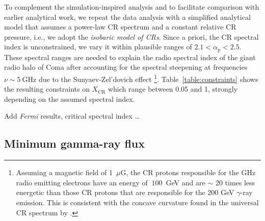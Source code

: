\documentclass[12pt,manuscript]{aastex}
\newcommand{\rmn}{\mathrm}
\newcommand{\CR}{\mathrm{CR}}
\begin{document}
To complement the simulation-inspired analysis and to facilitate comparison with
earlier analytical work, we repeat the data analysis with a simplified
analytical model that assumes a power-law CR spectrum and a constant relative CR
pressure, i.e., we adopt the {\em isobaric model of CRs}. Since a priori, the CR
spectral index is unconstrained, we vary it within plausible ranges of
$2.1<\alpha_\rmn{p}<2.5$. These spectral ranges are needed to explain the radio
spectral index of the giant radio halo of Coma after accounting for the spectral
steepening at frequencies $\nu\sim5~\rmn{GHz}$ due to the Sunyaev-Zel'dovich
effect \citep{article:PfrommerEnsslin:2004b}\footnote[4]{Assuming a magnetic field of
  1~$\mu$G, the CR protons responsible for the GHz radio emitting electrons have
  an energy of $~100$~GeV and are $\sim$ 20 times less energetic than those CR
  protons that are responsible for the 200 GeV $\gamma$-ray emission. This is
  consistent with the concave curvature found in the universal CR spectrum by
  \citet{article:PinzkePfrommer:2010}.}.  Table~\ref{table:constraints} shows the
resulting constraints on $X_\CR$ which range between 0.05 and 1, strongly
depending on the assumed spectral index.

Add {\em Fermi} results, critical spectral index \ldots


\subsection{Minimum gamma-ray flux}
\end{document}
